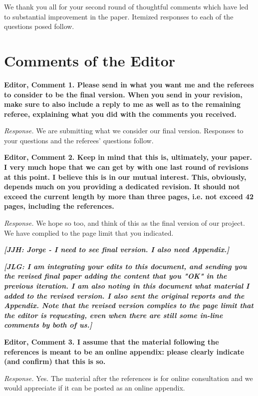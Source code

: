 \restoregeometry
\doublespacing

\noindent We thank you all for your second round of thoughtful comments which have led to substantial improvement in the paper. Itemized responses to each of the questions posed follow.

\section*{Comments of the Editor}

\noindent \textbf{Editor, Comment 1. Please send in what you want me and the referees to consider to be the final version. When you send in your revision, make sure to also include a reply to me as well as to the remaining referee, explaining what you did with the comments you received.} 

\noindent \textit{Response.} We are submitting what we consider our final version. Responses to your questions and the referees' questions follow. 

\noindent \textbf{Editor, Comment 2. Keep in mind that this is, ultimately, your paper. I very much hope that we can get by with one last round of revisions at this point. I believe this is in our mutual interest. This, obviously, depends much on you providing a dedicated revision. It should not exceed the current length by more than three pages, i.e. not exceed 42 pages, including the references.}

\noindent \textit{Response.} We hope so too, and think of this as the final version of our project. We have complied to the page limit that you indicated.

\noindent \textbf{\textit{[JJH: Jorge - I need to see final version. I also need Appendix.]}}

\noindent \textbf{\textit{[JLG: I am integrating your edits to this document, and sending you the revised final paper adding the content that you "OK" in the previous iteration. I am also noting in this document what material I added to the revised version. I also sent the original reports and the Appendix. Note that the revised version complies to the page limit that the editor is requesting, even when there are still some in-line comments by both of us.]}}

\noindent \textbf{Editor, Comment 3. I assume that the material following the references is meant to be an online appendix: please clearly indicate (and confirm) that this is so.}

\noindent \textit{Response.} Yes. The material after the references is for online consultation and we would appreciate if it can be posted as an online appendix.

